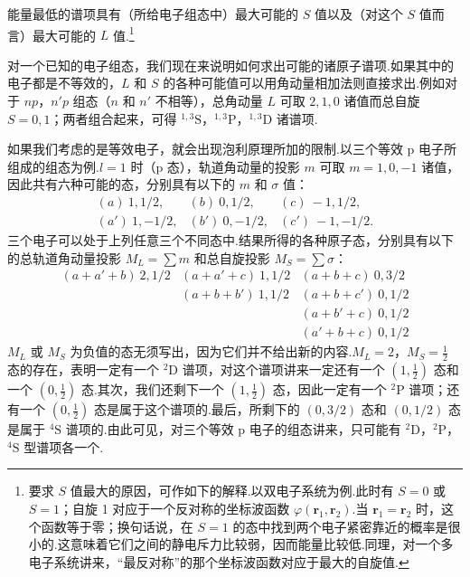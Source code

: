 能量最低的谱项具有（所给电子组态中）最大可能的 $S$ 值以及（对这个 $S$ 值而言）最大可能的 $L$ 值.\footnote{要求 $S$ 值最大的原因，可作如下的解释.以双电子系统为例.此时有 $S=0$ 或 $S=1$；自旋 1 对应于一个反对称的坐标波函数 $\varphi(\boldsymbol{r}_1,\boldsymbol{r}_2)$.当 $\boldsymbol{r}_1=\boldsymbol{r}_2$ 时，这个函数等于零；换句话说，在 $S=1$ 的态中找到两个电子紧密靠近的概率是很小的.这意味着它们之间的静电斥力比较弱，因而能量比较低.同理，对一个多电子系统讲来，“最反对称”的那个坐标波函数对应于最大的自旋值.}

对一个已知的电子组态，我们现在来说明如何求出可能的诸原子谱项.如果其中的电子都是不等效的，$L$ 和 $S$ 的各种可能值可以用角动量相加法则直接求出.例如对于 $np$，$n'p$ 组态（$n$ 和 $n'$ 不相等），总角动量 $L$ 可取 $2,1,0$ 诸值而总自旋 $S=0,1$；两者组合起来，可得 ${}^{1,3}\mathrm{S}$，${}^{1,3}\mathrm{P}$，${}^{1,3}\mathrm{D}$ 诸谱项.

如果我们考虑的是等效电子，就会出现泡利原理所加的限制.以三个等效 p 电子所组成的组态为例.$l=1$ 时（p 态），轨道角动量的投影 $m$ 可取 $m=1,0,-1$ 诸值，因此共有六种可能的态，分别具有以下的 $m$ 和 $\sigma$ 值：
\begin{equation*}
\begin{array}{ccc}
(a)\ 1,1/2, & (b)\ 0,1/2, & (c)\ -1,1/2,\\
(a')\ 1,-1/2, & (b')\ 0,-1/2, & (c')\ -1,-1/2.
\end{array}
\end{equation*}
三个电子可以处于上列任意三个不同态中.结果所得的各种原子态，分别具有以下的总轨道角动量投影 $M_L=\sum m$ 和总自旋投影 $M_S=\sum\sigma$：
\begin{equation*}
\begin{array}{ccc}
(a+a'+b)\ 2,1/2 & (a+a'+c)\ 1,1/2 & (a+b+c)\ 0,3/2\\
 & (a+b+b')\ 1,1/2 & (a+b+c')\ 0,1/2\\
 & & (a+b'+c)\ 0,1/2\\
 & & (a'+b+c)\ 0,1/2
\end{array}
\end{equation*}
$M_L$ 或 $M_S$ 为负值的态无须写出，因为它们并不给出新的内容.$M_L=2$，$M_S=\frac{1}{2}$ 态的存在，表明一定有一个 ${}^{2}\mathrm{D}$ 谱项，对这个谱项讲来一定还有一个 $\left(1,\frac{1}{2}\right)$ 态和一个 $\left(0,\frac{1}{2}\right)$ 态.其次，我们还剩下一个 $\left(1,\frac{1}{2}\right)$ 态，因此一定有一个 ${}^{2}\mathrm{P}$ 谱项；还有一个 $\left(0,\frac{1}{2}\right)$ 态是属于这个谱项的.最后，所剩下的 $(0,3/2)$ 态和 $(0,1/2)$ 态是属于 ${}^{4}\mathrm{S}$ 谱项的.由此可见，对三个等效 p 电子的组态讲来，只可能有 ${}^{2}\mathrm{D}$，${}^{2}\mathrm{P}$，${}^{4}\mathrm{S}$ 型谱项各一个.

